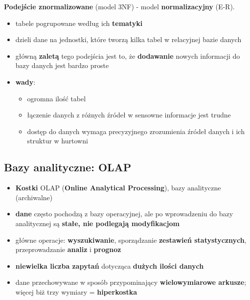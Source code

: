 \documentclass[a4paper]{article}
\begin{document}
    \textbf{Podejście znormalizowane} (model 3NF) - model \textbf{normalizacyjny} (E-R).
    \begin{itemize}[noitemsep]
        \item tabele pogrupowane według ich \textbf{tematyki}
        \item dzieli dane na jednostki, które tworzą kilka tabel w relacyjnej
        bazie danych
        \item główną \textbf{zaletą} tego podejścia jest to, że \textbf{dodawanie} nowych informacji
        do bazy danych jest bardzo proste
        \item \textbf{wady}:
        \begin{itemize}[noitemsep]
            \item ogromna ilość tabel
            \item łączenie danych z różnych źródeł w sensowne informacje jest trudne
            \item dostęp do danych wymaga precyzyjnego zrozumienia źródeł danych i ich struktur w hurtowni
        \end{itemize}
    \end{itemize}

    \subsection{Bazy analityczne: OLAP}
    \begin{itemize}[noitemsep]
        \item \textbf{Kostki} OLAP (\textbf{Online Analytical Processing}), bazy analityczne (archiwalne)
        \item \textbf{dane} często pochodzą z bazy operacyjnej, ale po wprowadzeniu do bazy
        analitycznej są \textbf{stałe, nie podlegają modyfikacjom}
        \item główne operacje: \textbf{wyszukiwanie}, sporządzanie \textbf{zestawień statystycznych}, przeprowadzanie
        \textbf{analiz} i \textbf{prognoz}
        \item \textbf{niewielka liczba zapytań} dotycząca \textbf{dużych ilości danych}
        \item dane przechowywane w sposób przypominający \textbf{wielowymiarowe arkusze}; więcej biż trzy wymiary =
        \textbf{hiperkostka}
    \end{itemize}
\end{document}
